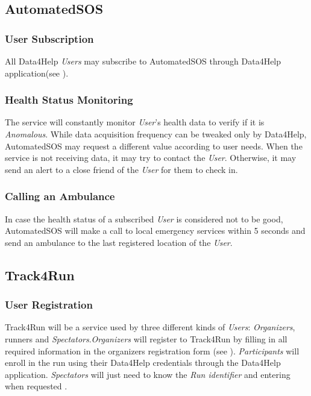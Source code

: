 \documentclass[../../rasd.tex]{subfiles}
\begin{document}
			\subsection{AutomatedSOS}
				
				\subsubsection{User Subscription}
				All Data4Help \textit{Users} may subscribe to AutomatedSOS through Data4Help application(see ).
				
				\subsubsection{Health Status Monitoring}
				The service will constantly monitor \textit{User}'s health data to verify if it is \textit{Anomalous}. While data acquisition frequency can be tweaked only by Data4Help, AutomatedSOS may request a different value according to user needs.  When the service is not receiving data, it may try to contact the \textit{User}. Otherwise, it may send an alert to a close friend of the \textit{User} for them to check in.
				
				\subsubsection{Calling an Ambulance} 
				In case the health status of a subscribed \textit{User} is considered not to be good, AutomatedSOS will make a call to local emergency services within 5 seconds and send an ambulance to the last registered location of the \textit{User}.

			\subsection{Track4Run}
				
				\subsubsection{User Registration}
				Track4Run will be a service used by three different kinds of \textit{Users}: \textit{Organizers}, runners and \textit{Spectators}.\textit{Organizers} will register to Track4Run by filling in all required information in the organizers registration form (see ). \textit{Participants} will enroll in the run using their Data4Help credentials through the Data4Help application. \textit{Spectators} will just need to know the \textit{Run identifier} and entering when requested .
				
\end{document}
